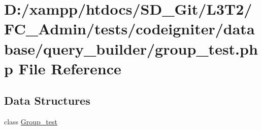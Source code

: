 \hypertarget{_admin_2tests_2codeigniter_2database_2query__builder_2group__test_8php}{}\section{D\+:/xampp/htdocs/\+S\+D\+\_\+\+Git/\+L3\+T2/\+F\+C\+\_\+\+Admin/tests/codeigniter/database/query\+\_\+builder/group\+\_\+test.php File Reference}
\label{_admin_2tests_2codeigniter_2database_2query__builder_2group__test_8php}
\subsection*{Data Structures}
\begin{DoxyCompactItemize}
\item 
class \hyperlink{class_group__test}{Group\+\_\+test}
\end{DoxyCompactItemize}

